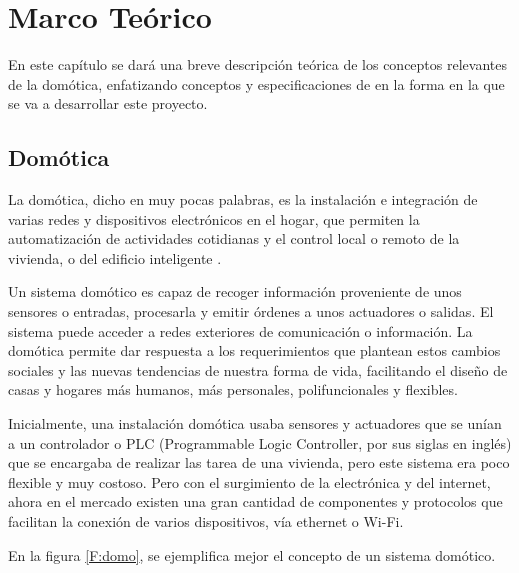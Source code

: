   \chapter{Marco Teórico} 
\label{C:MarcoTeórico}

En este  capítulo se dará una breve descripción teórica de los conceptos relevantes de la domótica, enfatizando conceptos y especificaciones de en la forma en la que se va a desarrollar este proyecto.

\section{Domótica}
La domótica, dicho en muy pocas palabras, es la instalación e integración de varias redes y dispositivos electrónicos en el hogar, que permiten la automatización de actividades cotidianas y el control local o remoto de la vivienda, o del edificio inteligente \cite{Madrid2007}.

Un sistema domótico es capaz de recoger información proveniente de unos sensores o entradas, procesarla y emitir órdenes a unos actuadores o salidas. El sistema puede acceder a redes exteriores de comunicación o información. La domótica permite dar respuesta a los requerimientos que plantean estos cambios sociales y las nuevas tendencias de nuestra forma de vida, facilitando el diseño de casas y hogares más humanos, más personales, polifuncionales y flexibles. 

Inicialmente, una instalación domótica usaba sensores y actuadores que se unían a un controlador o PLC (Programmable Logic Controller, por sus siglas en inglés) que se encargaba de realizar las tarea de una vivienda, pero este sistema era poco flexible y muy costoso. Pero con el surgimiento de la electrónica y del internet, ahora en el mercado existen una gran cantidad de componentes y protocolos que facilitan la conexión de varios dispositivos, vía ethernet o Wi-Fi. 

En la figura \ref{F:domo}, se ejemplifica mejor el concepto de un sistema domótico.

